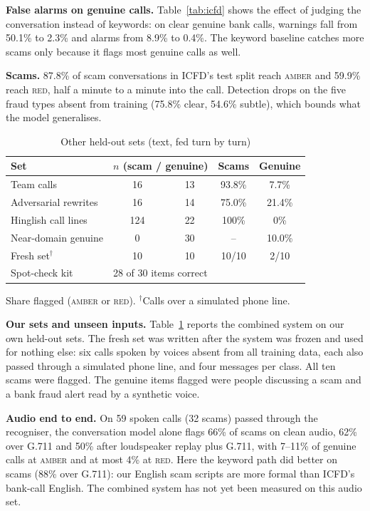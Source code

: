 \documentclass[conference,a4paper]{IEEEtran}
\newcommand{\amber}{\textsc{amber}}
\newcommand{\red}{\textsc{red}}
\begin{document}
\textbf{False alarms on genuine calls.} Table~\ref{tab:icfd} shows the effect of judging the conversation instead of
keywords: on clear genuine bank calls, warnings fall from 50.1\% to 2.3\% and alarms from 8.9\% to 0.4\%. The keyword
baseline catches more scams only because it flags most genuine calls as well.

\textbf{Scams.} 87.8\% of scam conversations in ICFD's test split reach \amber{} and 59.9\% reach \red{}, half a
minute to a minute into the call. Detection drops on the five fraud types absent from training (75.8\% clear,
54.6\% subtle), which bounds what the model generalises.

\begin{table}[t]
\centering
\caption{Other held-out sets (text, fed turn by turn)}
\label{tab:ours}
\small
\begin{tabular}{@{}lcccc@{}}
\toprule
Set & \multicolumn{2}{c}{$n$ (scam / genuine)} & Scams & Genuine \\
\midrule
Team calls & 16 & 13 & 93.8\% & 7.7\% \\
Adversarial rewrites & 16 & 14 & 75.0\% & 21.4\% \\
Hinglish call lines & 124 & 22 & 100\% & 0\% \\
Near-domain genuine & 0 & 30 & -- & 10.0\% \\
Fresh set$^\dagger$ & 10 & 10 & 10/10 & 2/10 \\
\midrule
Spot-check kit & \multicolumn{4}{l}{28 of 30 items correct} \\
\bottomrule
\end{tabular}

\vspace{2pt}\footnotesize Share flagged (\amber{} or \red{}). $^\dagger$Calls over a simulated phone line.
\end{table}

\textbf{Our sets and unseen inputs.} Table~\ref{tab:ours} reports the combined system on our own held-out sets. The
fresh set was written after the system was frozen and used for nothing else: six calls spoken by voices absent from
all training data, each also passed through a simulated phone line, and four messages per class. All ten scams were
flagged. The genuine items flagged were people discussing a scam and a bank fraud alert read by a synthetic voice.

\textbf{Audio end to end.} On 59 spoken calls (32 scams) passed through the recogniser, the conversation model alone
flags 66\% of scams on clean audio, 62\% over G.711 and 50\% after loudspeaker replay plus G.711, with 7--11\% of
genuine calls at \amber{} and at most 4\% at \red{}. Here the keyword path did better on scams (88\% over G.711):
our English scam scripts are more formal than ICFD's bank-call English. The combined system has not yet been measured
on this audio set.
\end{document}
